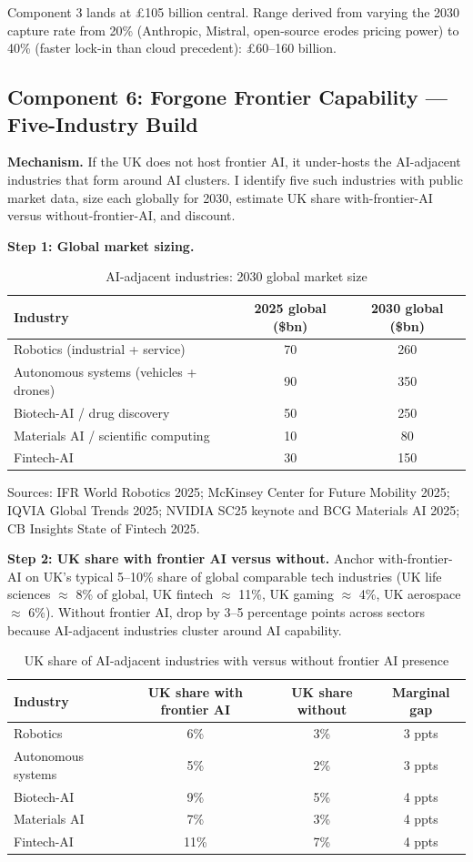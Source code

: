 \documentclass[11pt,letterpaper]{article}
\theoremstyle{remark}
\begin{document}
Component 3 lands at \pounds105 billion central. Range derived from varying the 2030 capture rate from 20\% (Anthropic, Mistral, open-source erodes pricing power) to 40\% (faster lock-in than cloud precedent): \pounds60--160 billion.

\subsection{Component 6: Forgone Frontier Capability — Five-Industry Build}

\textbf{Mechanism.} If the UK does not host frontier AI, it under-hosts the AI-adjacent industries that form around AI clusters. I identify five such industries with public market data, size each globally for 2030, estimate UK share with-frontier-AI versus without-frontier-AI, and discount.

\textbf{Step 1: Global market sizing.}

\begin{table}[ht]
\centering
\caption{AI-adjacent industries: 2030 global market size}
\begin{tabular}{lcc}
\toprule
Industry & 2025 global (\$bn) & 2030 global (\$bn) \\
\midrule
Robotics (industrial + service) & 70 & 260 \\
Autonomous systems (vehicles + drones) & 90 & 350 \\
Biotech-AI / drug discovery & 50 & 250 \\
Materials AI / scientific computing & 10 & 80 \\
Fintech-AI & 30 & 150 \\
\bottomrule
\end{tabular}
\end{table}

Sources: IFR World Robotics 2025; McKinsey Center for Future Mobility 2025; IQVIA Global Trends 2025; NVIDIA SC25 keynote and BCG Materials AI 2025; CB Insights State of Fintech 2025.

\textbf{Step 2: UK share with frontier AI versus without.} Anchor with-frontier-AI on UK's typical 5--10\% share of global comparable tech industries (UK life sciences $\approx$ 8\% of global, UK fintech $\approx$ 11\%, UK gaming $\approx$ 4\%, UK aerospace $\approx$ 6\%). Without frontier AI, drop by 3--5 percentage points across sectors because AI-adjacent industries cluster around AI capability.

\begin{table}[ht]
\centering
\caption{UK share of AI-adjacent industries with versus without frontier AI presence}
\begin{tabular}{lccc}
\toprule
Industry & UK share with frontier AI & UK share without & Marginal gap \\
\midrule
Robotics & 6\% & 3\% & 3 ppts \\
Autonomous systems & 5\% & 2\% & 3 ppts \\
Biotech-AI & 9\% & 5\% & 4 ppts \\
Materials AI & 7\% & 3\% & 4 ppts \\
Fintech-AI & 11\% & 7\% & 4 ppts \\
\bottomrule
\end{tabular}
\end{table}
\end{document}
